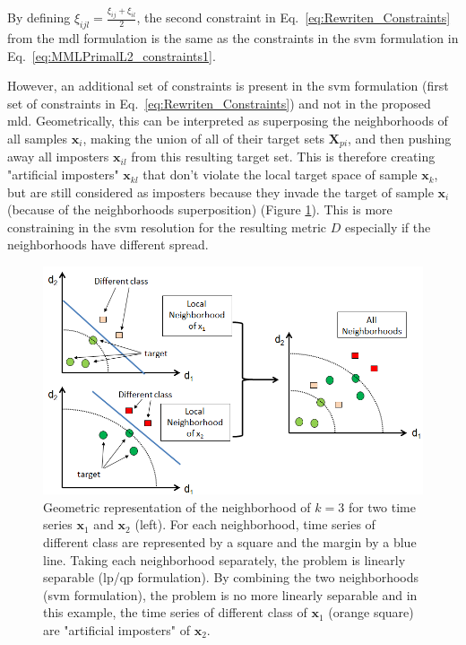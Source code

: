 \noindent By defining $\xi_{ijl}=\frac{\xi_{ij}+\xi_{il}}{2}$, the second constraint in Eq.~\ref{eq:Rewriten_Constraints} from the {\sc mdl} formulation is the same as the constraints in the {\sc svm} formulation in Eq.~\ref{eq:MMLPrimalL2_constraints1}. 

\indent However, an additional set of constraints is present in the {\sc svm} formulation (first set of constraints in Eq.~\ref{eq:Rewriten_Constraints}) and not in the proposed {\sc mld}. Geometrically, this can be interpreted as superposing the neighborhoods of all samples $\textbf{x}_i$, making the union of all of their target sets $\textbf{X}_{pi}$, and then pushing away all imposters $\textbf{x}_{il}$ from this resulting target set. This is therefore creating "artificial imposters" $\textbf{x}_{kl}$ that don't violate the local target space of sample $\textbf{x}_k$, but are still considered as imposters because they invade the target of sample $\textbf{x}_i$ (because of the neighborhoods superposition) (Figure \ref{fig:Neighborhood_scaling_problem}). This is more constraining in the {\sc svm} resolution for the resulting metric $D$ especially if the neighborhoods have different spread. 

\begin{figure}[h!]
	\centering
	\includegraphics[width=0.8\linewidth]{images/Neighborhood_scaling_problem}
	\caption{Geometric representation of the neighborhood of $k=3$ for two time series $\textbf{x}_1$ and $\textbf{x}_2$ (left). For each neighborhood, time series of different class are represented by a square and the margin by a blue line. Taking each neighborhood separately, the problem is linearly separable ({\sc lp}/{\sc qp} formulation). By combining the two neighborhoods ({\sc svm} formulation), the problem is no more linearly separable and in this example, the time series of different class of $\textbf{x}_1$ (orange square) are "artificial imposters" of $\textbf{x}_2$. }
	\label{fig:Neighborhood_scaling_problem}
\end{figure}


